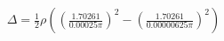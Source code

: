 \documentclass[preview]{standalone}
\begin{document}
\begin{align*}
\Delta  = \frac{1}{2} \rho ((\frac{1.70261}{0.00025\pi})^2 - (\frac{1.70261}{0.00000625\pi})^2)
\end{align*}
\end{document}

